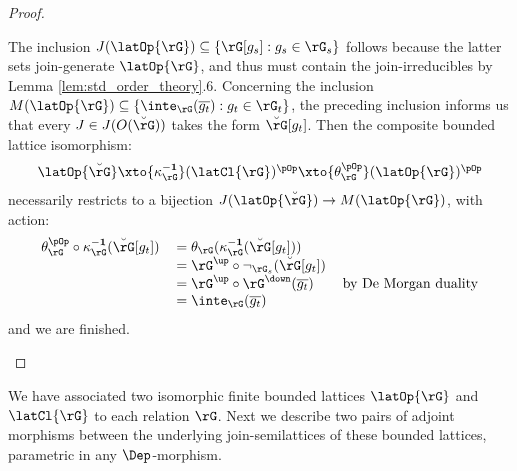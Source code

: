 \documentclass{article}
\begin{document}
\begin{proof}
\begin{enumerate}
The inclusion $J(\latOp{\rG}) \subseteq \{ \rG[g_s] : g_s \in \rG_s \}$ follows because the latter sets join-generate $\latOp{\rG}$, and thus must contain the join-irreducibles by Lemma \ref{lem:std_order_theory}.6. Concerning the inclusion $M(\latOp{\rG}) \subseteq \{ \inte_\rG(\overline{g_t}) : g_t \in \rG_t \}$, the preceding inclusion informs us that every $J \in J(O(\breve{\rG}))$ takes the form $\breve{\rG}[g_t]$. Then the composite bounded lattice isomorphism:
\[
\begin{tabular}{c}
$\latOp{\breve{\rG}}
\xto{\kappa_\rG^{\bf-1}} (\latCl{\rG})^{\pOp}
\xto{\theta_\rG^{\pOp}} (\latOp{\rG})^{\pOp}$
\end{tabular}
\]
necessarily restricts to a bijection $J(\latOp{\breve{\rG}}) \to M(\latOp{\rG})$, with action:
\[
\begin{tabular}{lll}
$\theta_\rG^{\pOp} \circ \kappa_\rG^{\bf-1}(\breve{\rG}[g_t])$
&
$= \theta_\rG(\kappa_\rG^{\bf-1}(\breve{\rG}[g_t]))$
&
\\&
$= \rG^\up \circ \neg_{\rG_s}(\breve{\rG}[g_t])$
&
\\&
$= \rG^\up \circ \rG^\down (\overline{g_t})$
& by De Morgan duality
\\&
$= \inte_\rG(\overline{g_t})$
\end{tabular}
\]
and we are finished.
\end{enumerate}
\end{proof}

We have associated two isomorphic finite bounded lattices $\latOp{\rG}$ and $\latCl{\rG}$ to each relation $\rG$. Next we describe two pairs of adjoint morphisms between the underlying join-semilattices of these bounded lattices, parametric in any $\Dep$-morphism.
\end{document}
